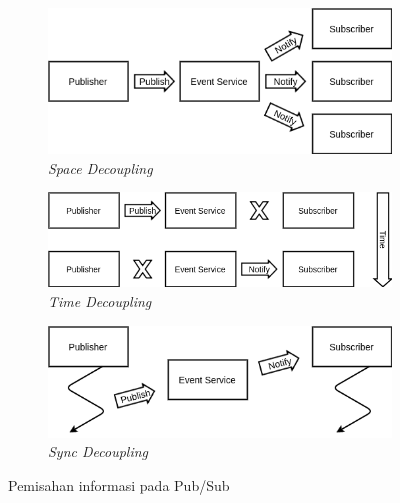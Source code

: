 \begin{figure}[!]
	\centering
	\begin{subfigure}[t]{9cm}
		\centering
		\includegraphics[width=\textwidth]{Resources/Images/space-decoupling}
		\caption{\textit{Space Decoupling}}
		\label{fig:space-decoupling}
	\end{subfigure}%
	
	\begin{subfigure}[t]{10cm}
		\centering
		\includegraphics[width=\textwidth]{Resources/Images/time-decoupling}
		\caption{\textit{Time Decoupling}}
		\label{fig:time-decoupling}
	\end{subfigure}%
	
	\begin{subfigure}[t]{9cm}
		\centering
		\includegraphics[width=\textwidth]{Resources/Images/sync-decoupling}
		\caption{\textit{Sync Decoupling}}
		\label{fig:sync-decoupling}
	\end{subfigure}
	\caption{Pemisahan informasi pada Pub/Sub \citep{eugster_many_2003}}
	\label{fig:space-time-sync-decoupling}
\end{figure}
